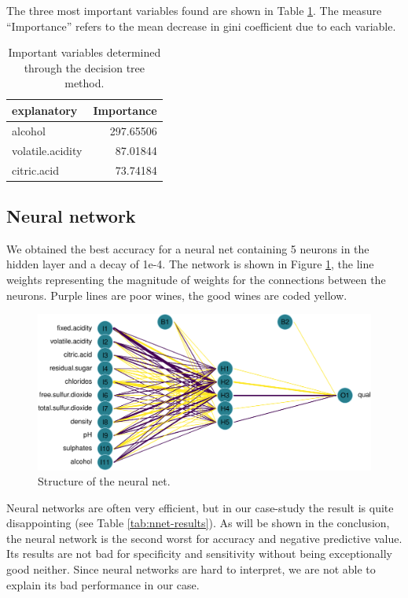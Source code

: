 \documentclass[11pt,]{article}
\begin{document}
The three most important variables found are shown in Table
\ref{tab:importantdectree}. The measure ``Importance'' refers to the
mean decrease in gini coefficient due to each variable.

\begin{table}[!h]

\caption{\label{tab:importantdectree}Important variables determined through the decision tree method.}
\centering
\begin{tabular}[t]{lr}
\toprule
explanatory & Importance\\
\midrule
alcohol & 297.65506\\
volatile.acidity & 87.01844\\
citric.acid & 73.74184\\
\bottomrule
\end{tabular}
\end{table}

\hypertarget{neural-network-1}{%
\subsection{Neural network}\label{neural-network-1}}

We obtained the best accuracy for a neural net containing 5 neurons in
the hidden layer and a decay of 1e-4. The network is shown in Figure
\ref{fig:net}, the line weights representing the magnitude of weights
for the connections between the neurons. Purple lines are poor wines,
the good wines are coded yellow.

\begin{figure}

{\centering \includegraphics[width=0.75\linewidth]{./figures/net-1} 

}

\caption{Structure of the neural net.}\label{fig:net}
\end{figure}

Neural networks are often very efficient, but in our case-study the
result is quite disappointing (see Table \ref{tab:nnet-results}). As
will be shown in the conclusion, the neural network is the second worst
for accuracy and negative predictive value. Its results are not bad for
specificity and sensitivity without being exceptionally good neither.
Since neural networks are hard to interpret, we are not able to explain
its bad performance in our case.
\end{document}
